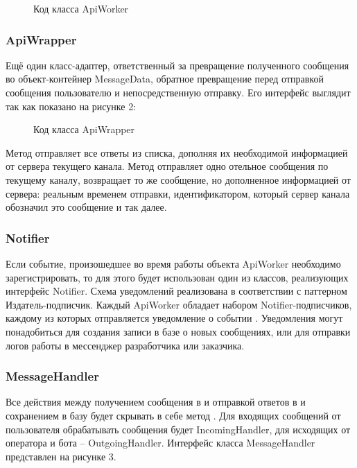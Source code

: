     \begin{figure}[H]
        \centering
        
        \caption{Код класса ApiWorker}
        \label{fig:api_worker}
    \end{figure}

    \subsubsection*{ApiWrapper}
    Ещё один класс-адаптер, ответственный за превращение полученного сообщения 
    во объект-контейнер MessageData, обратное превращение перед отправкой
    сообщения пользователю и непосредственную отправку.
    Его интерфейс выглядит так как показано на рисунке 2:

    \begin{figure}[H]
        \centering
        
        \caption{Код класса ApiWrapper}
        \label{fig:api_wrapper}
    \end{figure}
    
    Метод  отправляет все ответы из списка, дополняя их
    необходимой информацией от сервера текущего канала. 
    Метод  отправляет одно отельное сообщения по текущему каналу,
    возвращает то же сообщение, но дополненное информацией от сервера: реальным временем
    отправки, идентификатором, который сервер канала обозначил это сообщение и так далее.

    \subsubsection*{Notifier}
    Если событие, произошедшее во время работы объекта ApiWorker необходимо
    зарегистрировать, то для этого будет использован один из классов,
    реализующих интерфейс Notifier.
    Схема уведомлений реализована в соответствии с паттерном Издатель-подписчик.
    Каждый ApiWorker обладает набором Notifier-подписчиков, каждому из которых
    отправляется уведомление о событии .
    Уведомления могут понадобиться для создания записи в базе о новых сообщениях,
    или для отправки логов работы в мессенджер разработчика или заказчика.

    \subsubsection*{MessageHandler}
    Все действия между получением сообщения в  и отправкой ответов
    в  и сохранением в базу будет скрывать в себе метод
    . Для входящих сообщений от пользователя обрабатывать
    сообщения будет IncomingHandler, для исходящих от оператора и бота -- OutgoingHandler.
    Интерфейс класса MessageHandler представлен на рисунке 3.

